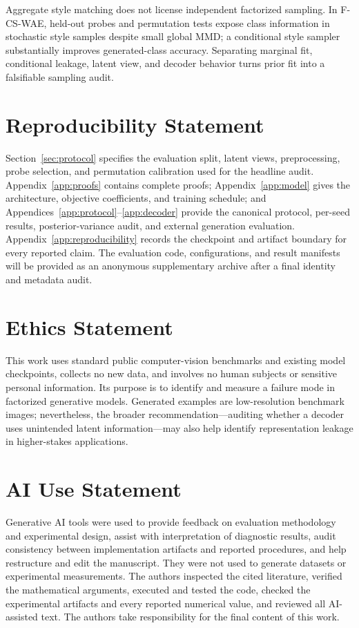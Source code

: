 \documentclass{article}
\newcommand{\ours}{F-CS-WAE}
\begin{document}
Aggregate style matching does not license independent factorized sampling.
In \ours{}, held-out probes and permutation tests expose class information in
stochastic style samples despite small global MMD; a conditional style
sampler substantially improves generated-class accuracy.  Separating
marginal fit, conditional leakage, latent view, and decoder behavior turns
prior fit into a falsifiable sampling audit.

\clearpage
\section*{Reproducibility Statement}

Section~\ref{sec:protocol} specifies the evaluation split, latent views,
preprocessing, probe selection, and permutation calibration used for the
headline audit.  Appendix~\ref{app:proofs} contains complete proofs;
Appendix~\ref{app:model} gives the architecture, objective coefficients, and
training schedule; and Appendices~\ref{app:protocol}--\ref{app:decoder}
provide the canonical protocol, per-seed results, posterior-variance audit,
and external generation evaluation.  Appendix~\ref{app:reproducibility}
records the checkpoint and artifact boundary for every reported claim.  The
evaluation code, configurations, and result manifests will be provided as an
anonymous supplementary archive after a final identity and metadata audit.

\section*{Ethics Statement}

This work uses standard public computer-vision benchmarks and existing model
checkpoints, collects no new data, and involves no human subjects or sensitive
personal information.  Its purpose is to identify and measure a failure mode
in factorized generative models.  Generated examples are low-resolution
benchmark images; nevertheless, the broader recommendation---auditing whether
a decoder uses unintended latent information---may also help identify
representation leakage in higher-stakes applications.

\section*{AI Use Statement}

Generative AI tools were used to provide feedback on evaluation methodology
and experimental design, assist with interpretation of diagnostic results,
audit consistency between implementation artifacts and reported procedures,
and help restructure and edit the manuscript.  They were not used to generate
datasets or experimental measurements.  The authors inspected the cited
literature, verified the mathematical arguments, executed and tested the
code, checked the experimental artifacts and every reported numerical value,
and reviewed all AI-assisted text.  The authors take responsibility for the
final content of this work.

\clearpage



\appendix

\end{document}
